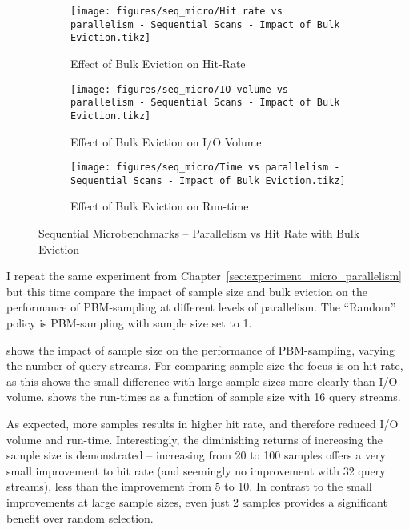 \begin{figure}

\centering
    \begin{subfigure}{0.45\textwidth}
        \centering
        \texttt{[image: figures/seq\_micro/Hit rate vs parallelism - Sequential Scans - Impact of Bulk Eviction.tikz]}
        \caption{Effect of Bulk Eviction on Hit-Rate}
        \label{fig:seq_micro_parallel_hitrate_bulk}
    \end{subfigure}\hspace{0.05\textwidth}%
    \begin{subfigure}{0.45\textwidth}
        \centering
        \texttt{[image: figures/seq\_micro/IO volume vs parallelism - Sequential Scans - Impact of Bulk Eviction.tikz]}
        \caption{Effect of Bulk Eviction on I/O Volume}
        \label{fig:seq_micro_parallel_iovol_bulk}
    \end{subfigure}
    
\vspace{20pt}
    \begin{subfigure}{0.45\textwidth}
        \centering
        \texttt{[image: figures/seq\_micro/Time vs parallelism - Sequential Scans - Impact of Bulk Eviction.tikz]}
        \caption{Effect of Bulk Eviction on Run-time}
        \label{fig:seq_micro_parallel_time_bulk}
    \end{subfigure}
    \caption{Sequential Microbenchmarks -- Parallelism vs Hit Rate with Bulk Eviction}
    \label{fig:seq_micro_parallel_bulkeviction}
\end{figure}


I repeat the same experiment from Chapter~\ref{sec:experiment_micro_parallelism} but this time compare the impact of sample size and bulk eviction on the performance of PBM-sampling at different levels of parallelism. The ``Random'' policy is PBM-sampling with sample size set to 1.

 shows the impact of sample size on the performance of PBM-sampling, varying the number of query streams. For comparing sample size the focus is on hit rate, as this shows the small difference with large sample sizes more clearly than I/O volume.  shows the run-times as a function of sample size with 16 query streams.

As expected, more samples results in higher hit rate, and therefore reduced I/O volume and run-time. Interestingly, the diminishing returns of increasing the sample size is demonstrated -- increasing from 20 to 100 samples offers a very small improvement to hit rate (and seemingly no improvement with 32 query streams), less than the improvement from 5 to 10. In contrast to the small improvements at large sample sizes, even just 2 samples provides a significant benefit over random selection. %

